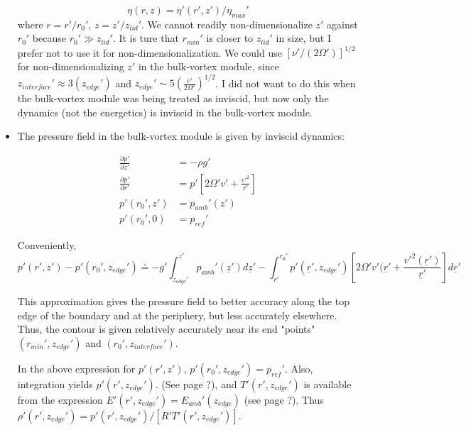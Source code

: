 \documentclass{article}
\begin{document}
\begin{itemize}
\begin{equation}
	\eta(r,z) = \eta'(r',z')/\eta_{max}'
\end{equation}
where $r = r'/r_0'$, $z=z'/z_{lid}'$. We cannot readily non-dimensionalize $z'$ against $r_0'$ because $r_0' \gg z_{lid}'$. It is ture that $r_{min}'$ is closer to $z_{lid}'$ in size, but I prefer not to use it for non-dimensionalization. We could use $[\nu'/(2\Omega')]^{1/2}$ for non-dimensionalizing $z'$ in the bulk-vortex module, since $z_{interface}' \approx 3(z_{edge}')$ and $z_{edge}' \sim 5 \left( \frac{v'}{2\Omega'}\right)^{1/2}$. I did not want to do this when the bulk-vortex module was being treated as inviscid, but now only the dynamics (not the energetics) is inviscid in the bulk-vortex module.

\item The pressure field in the bulk-vortex module is given by inviscid dynamics:

\begin{equation}
\begin{split}
	\frac{\partial p'}{\partial z'} &= -\rho g' \\
	\frac{\partial p'}{\partial r'} & = p'\left[ 2\Omega' v' + \frac{v'^2}{r'} \right ]\\
	p'(r_0',z') &= p_{amb}'(z') \\
	p'(r_0',0) &= p_{ref}'
\end{split}
\end{equation}

Conveniently,
\begin{equation}
	p'(r',z') - p'(r_0', z_{edge}') \doteq -g' \int_{z_{edge}'}^{z'} p_{amb}'(\underline{z}') d\underline{z}' - \int_{r'}^{r_0'} p'(\underline{r}', z_{edge}') \left[ 2\Omega'v'(\underline{r}' + \frac{v'^2(\underline{r}')}{\underline{r}'}\right] d\underline{r}'
\end{equation}

This approximation gives the pressure field to better accuracy along the top edge of the boundary and at the periphery, but less accurately elsewhere. Thus, the contour is given relatively accurately near its end "points" $(r_{min}', z_{edge}')$ and $(r_0', z_{interface}')$.

In the above expression for $p'(r',z')$, $p'(r_0', z_{edge}') = p_{ref}'$. Also, integration yields $p'(r',z_{edge}')$. (See page ?), and $T'(r',z_{edge}')$ is available from the expression $E'(r',z_{edge}') = E_{amb}'(z_{edge})$ (see page ?). Thus $\rho'(r',z_{edge}') = p'(r',z_{edge}')/[R' T'(r',z_{edge}')]$.


\end{itemize}
\end{document}
